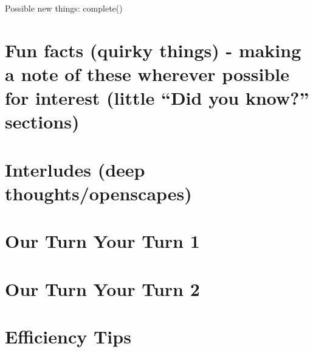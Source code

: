 \documentclass[]{book}
\begin{document}
Possible new things:
complete()

\hypertarget{fun-facts-quirky-things---making-a-note-of-these-wherever-possible-for-interest-little-did-you-know-sections-4}{%
\section{Fun facts (quirky things) - making a note of these wherever possible for interest (little ``Did you know?'' sections)}\label{fun-facts-quirky-things---making-a-note-of-these-wherever-possible-for-interest-little-did-you-know-sections-4}}

\hypertarget{interludes-deep-thoughtsopenscapes-7}{%
\section{Interludes (deep thoughts/openscapes)}\label{interludes-deep-thoughtsopenscapes-7}}

\hypertarget{our-turn-your-turn-1-2}{%
\section{Our Turn Your Turn 1}\label{our-turn-your-turn-1-2}}

\hypertarget{our-turn-your-turn-2-3}{%
\section{Our Turn Your Turn 2}\label{our-turn-your-turn-2-3}}

\hypertarget{efficiency-tips-8}{%
\section{Efficiency Tips}\label{efficiency-tips-8}}


\end{document}
